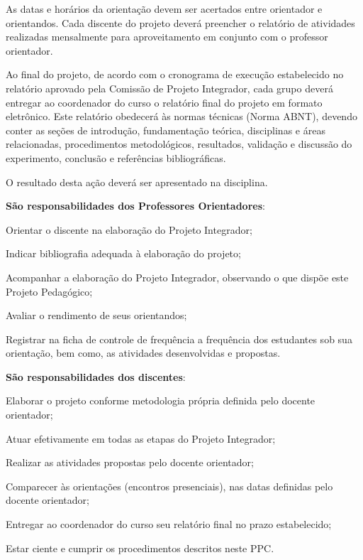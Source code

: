 \documentclass[
	12pt,				%
	openright,			%
	twoside,			%
	a4paper,			%
	chapter=TITLE,		%
	english,			%
	french,				%
	spanish,			%
	brazil,				%
	]{abntex2}
\begin{document}
As datas e horários da orientação devem ser acertados entre orientador e orientandos. Cada discente do projeto deverá preencher o relatório de atividades realizadas mensalmente para aproveitamento  em conjunto com o professor orientador. 

Ao final do projeto, de acordo com o cronograma de execução estabelecido no relatório aprovado pela  Comissão de Projeto Integrador, cada grupo deverá entregar ao coordenador do curso o relatório final do projeto em formato eletrônico. Este relatório  obedecerá às normas técnicas (Norma ABNT), devendo  conter as seções de introdução, fundamentação teórica, disciplinas e áreas relacionadas, procedimentos metodológicos, resultados, validação e discussão do experimento, conclusão e referências bibliográficas. 

O resultado desta ação deverá ser apresentado na disciplina.



\textbf{São responsabilidades dos Professores Orientadores}:
\begin{alineas}
    \item Orientar o discente na elaboração do Projeto Integrador;
    \item Indicar bibliografia adequada à elaboração do projeto;
    \item Acompanhar a elaboração do Projeto Integrador, observando o que dispõe este Projeto Pedagógico;
    \item Avaliar o rendimento de seus orientandos;
    \item Registrar na ficha de controle de frequência a frequência dos estudantes sob sua orientação, bem como, as atividades desenvolvidas e propostas.
\end{alineas}   

\textbf{São responsabilidades dos discentes}:
\begin{alineas}
    \item Elaborar o projeto conforme metodologia própria definida pelo docente orientador;
    \item Atuar efetivamente em todas as etapas do Projeto Integrador;
    \item Realizar as atividades propostas pelo docente orientador;
    \item Comparecer às orientações (encontros presenciais), nas datas definidas pelo docente orientador;
    \item  Entregar ao coordenador do curso seu relatório final no prazo estabelecido;
    \item  Estar ciente e cumprir os procedimentos descritos neste PPC.
\end{alineas}
\end{document}
